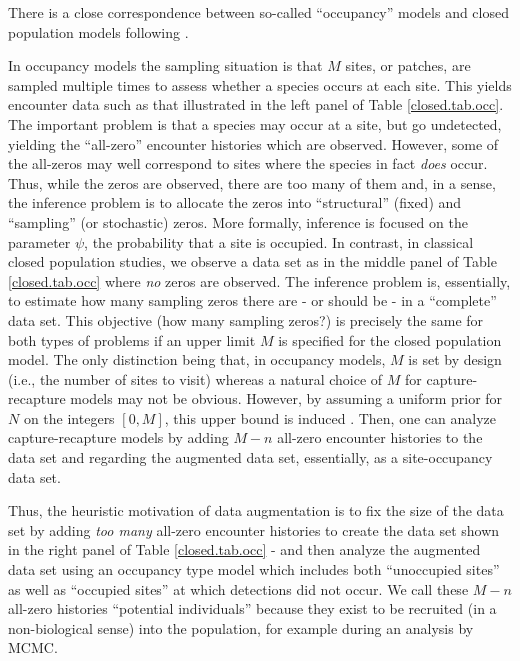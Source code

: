 There is a close correspondence between so-called ``occupancy'' models and closed
population models following \citet[][sec. 5.6]{royle_dorazio:2008}.

In occupancy models \citep{mackenzie_etal:2002, tyre_etal:2003} the
sampling situation is that $M$ sites, or patches, are sampled multiple
times to assess whether a species occurs at each site.  This yields
encounter data such as that illustrated in the left panel of Table
\ref{closed.tab.occ}. The important problem is that a species may occur at
a site, but go undetected, yielding the ``all-zero'' encounter
histories which are observed. However, some of the all-zeros may well
correspond to sites where the species in fact {\it does}
occur. Thus, while the zeros are observed, there are too many of them
and, in a sense, the inference problem is to allocate the zeros into
``structural'' (fixed) and ``sampling'' (or stochastic) zeros. More
formally, inference is focused on the parameter $\psi$, the
probability that a site is occupied.  In contrast, in classical closed
population studies, we observe a data set as in the middle panel of
Table \ref{closed.tab.occ} where {\it no} zeros are observed. The inference
problem is, essentially, to estimate how many sampling zeros there are
- or should be - in a ``complete'' data set. This objective
(how many sampling zeros?) is precisely the same for both types of
problems if an upper limit $M$ is specified for the closed population
model. The only distinction being that, in occupancy models, $M$ is
set by design (i.e., the number of sites to visit) whereas a natural
choice of $M$ for capture-recapture models may not be
obvious. However, by assuming a uniform prior for $N$ on the integers
$[0,M]$, this upper bound is induced \citep{royle_etal:2007}. Then,
one can analyze capture-recapture models by adding $M-n$ all-zero
encounter histories to the data set and regarding the augmented data
set, essentially, as a site-occupancy data set.

Thus, the heuristic motivation of data augmentation is to fix the size
of the data set by adding {\it too many} all-zero encounter histories
to create the data set shown in the right panel of Table
\ref{closed.tab.occ} - and then analyze the augmented data set using an
occupancy type model which includes both ``unoccupied sites'' as well
as ``occupied sites'' at which detections did not occur. We call these
$M-n$ all-zero histories ``potential individuals'' because they exist
to be recruited (in a non-biological sense) into the population, for
example during an analysis by MCMC.

